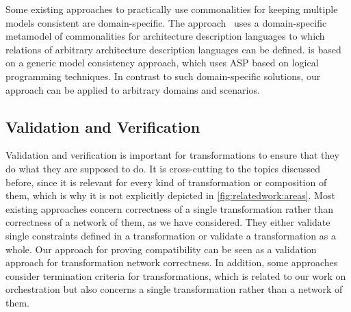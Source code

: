 Some existing approaches to practically use commonalities for keeping multiple models consistent are domain-specific.
The \dually approach~\cite{malavolta2010ADLInteroperability-TSE, eramo2012Dually-SoSym} uses a domain-specific metamodel of commonalities for architecture description languages to which relations of arbitrary architecture description languages can be defined.
\dually is based on a generic model consistency approach, which uses \gls{ASP} based on logical programming techniques.
In contrast to such domain-specific solutions, our \commonalities approach can be applied to arbitrary domains and scenarios.


\subsection{Validation and Verification}

Validation and verification is important for transformations to ensure that they do what they are supposed to do.
It is cross-cutting to the topics discussed before, since it is relevant for every kind of transformation or composition of them, which is why it is not explicitly depicted in \autoref{fig:relatedwork:areas}.
Most existing approaches concern correctness of a single transformation rather than correctness of a network of them, as we have considered.
They either validate single constraints defined in a transformation or validate a transformation as a whole.
Our approach for proving compatibility can be seen as a validation approach for transformation network correctness.
In addition, some approaches consider termination criteria for transformations, which is related to our work on orchestration but also concerns a single transformation rather than a network of them.


